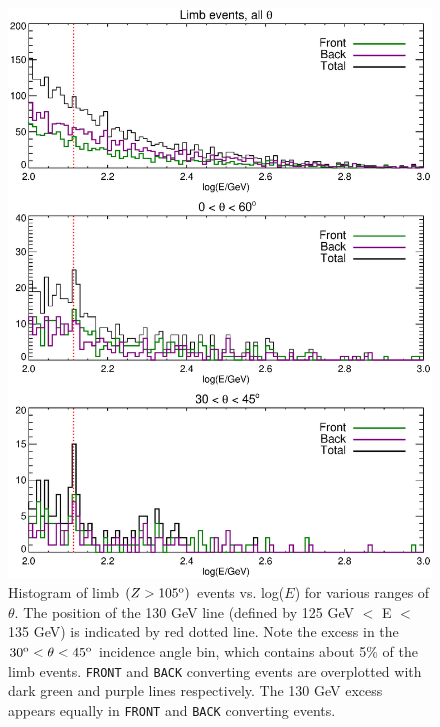 \documentclass[aps,twocolumn,prd,superscriptaddress,showpacs,nofootinbib,fixfloat]{revtex4}
\newcommand{\degree}{^{\rm o}}
\begin{document}
\begin{figure}
  \centering
  \includegraphics[width=1.0\linewidth]{plots/Ehist-all.ps}
  \caption{Histogram of limb $(Z>105\degree)$ events vs.
    log($E$) for various ranges of $\theta$. The position of
    the 130 GeV line (defined by 125 GeV $<$ E $<$ 135 GeV) is
    indicated by red dotted line.  Note the excess in the
    $30\degree < \theta < 45\degree$ incidence angle bin,
    which contains about 5\% of the limb
    events. \texttt{FRONT} and \texttt{BACK} converting
    events are overplotted with dark green and purple lines
    respectively. The 130 GeV excess appears equally in
    \texttt{FRONT} and \texttt{BACK} converting events.}
  \label{fig:Ehist-all}
\end{figure}
\end{document}
